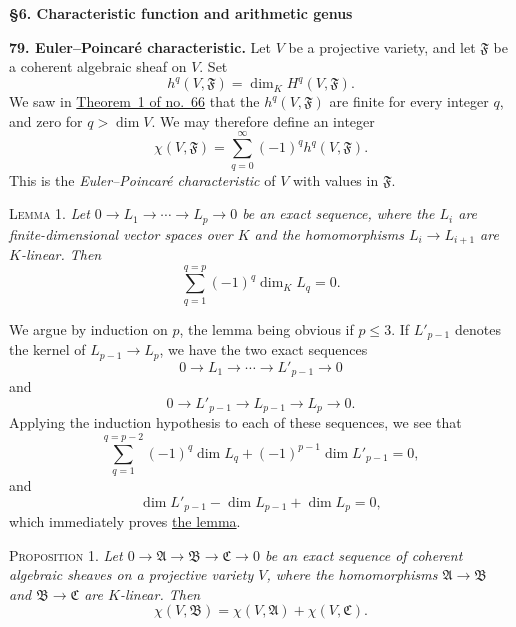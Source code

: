 
\medskip
{}\label{fac:III:6}
\begin{center}
\textbf{\S6. Characteristic function and arithmetic genus}
\end{center}

\label{fac:III:6:no:79}
\textbf{79. Euler--Poincaré characteristic.}
Let $V$ be a projective variety, and let $\mathfrak F$ be a coherent
algebraic sheaf on $V$. Set
\label{fac:III:6:no:79:def:hq}
\[
h^q(V,\mathfrak F)=\dim_K H^q(V,\mathfrak F).
\]
We saw in \hyperref[fac:III:3:no:66:theorem:1]{Theorem~1 of no.~66}
that the $h^q(V,\mathfrak F)$ are finite for every integer $q$, and
zero for $q>\dim V$. We may therefore define an integer
\label{fac:III:6:no:79:def:chi}
\[
\chi(V,\mathfrak F)=\sum_{q=0}^{\infty}(-1)^q h^q(V,\mathfrak F).
\]
This is the \textit{Euler--Poincaré characteristic} of $V$ with values
in $\mathfrak F$.

\label{fac:III:6:no:79:lemma:1}
\textsc{Lemma 1.} \textit{Let
$0\longrightarrow L_1\longrightarrow\cdots\longrightarrow
L_p\longrightarrow0$ be an exact sequence, where the $L_i$ are
finite-dimensional vector spaces over $K$ and the homomorphisms
$L_i\to L_{i+1}$ are $K$-linear. Then}
\label{fac:III:6:no:79:lemma:1:formula}
\[
\sum_{q=1}^{q=p}(-1)^q\dim_K L_q=0.
\]

We argue by induction on $p$, the lemma being obvious if $p\leq3$.
If $L'_{p-1}$ denotes the kernel of $L_{p-1}\to L_p$, we have the two
exact sequences
\label{fac:III:6:no:79:lemma:1:sequences}
\[
0\longrightarrow L_1\longrightarrow\cdots\longrightarrow
L'_{p-1}\longrightarrow0
\]
and
\[
0\longrightarrow L'_{p-1}\longrightarrow L_{p-1}
\longrightarrow L_p\longrightarrow0.
\]
Applying the induction hypothesis to each of these sequences, we see
that
\[
\sum_{q=1}^{q=p-2}(-1)^q\dim L_q
 +(-1)^{p-1}\dim L'_{p-1}=0,
\]
and
\[
\dim L'_{p-1}-\dim L_{p-1}+\dim L_p=0,
\]
which immediately proves \hyperref[fac:III:6:no:79:lemma:1]{the lemma}.

\label{fac:III:6:no:79:prop:1}
\textsc{Proposition 1.} \textit{Let
$0\longrightarrow\mathfrak A\longrightarrow\mathfrak B
\longrightarrow\mathfrak C\longrightarrow0$ be an exact sequence of
coherent algebraic sheaves on a projective variety $V$, where the
homomorphisms $\mathfrak A\to\mathfrak B$ and
$\mathfrak B\to\mathfrak C$ are $K$-linear. Then}
\label{fac:III:6:no:79:prop:1:formula}
\[
\chi(V,\mathfrak B)=\chi(V,\mathfrak A)+\chi(V,\mathfrak C).
\]

